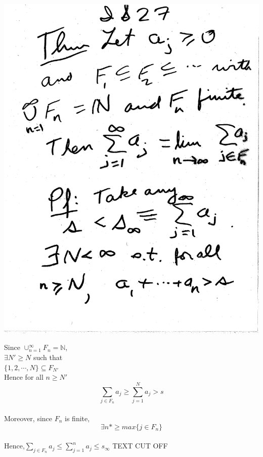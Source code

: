 \documentclass[10pt,a4paper]{article}
\begin{document}
\includegraphics[scale=.5]{Pages/IS_27}

\newpage

\noindent Since $ \cup_{n=1}^{\infty} F_n = \mathbb{N}$, 
\\ $ \exists N' \geq N$ such that
\\ $\{1,2, \cdots, N\} \subseteq F_{N'}$ 
\\ Hence for all $ n \geq N'$
$$ \sum_{j \in F_n} a_j \geq \sum_{j=1}^{N} a_j > s $$
\\ \noindent Moreover, since $F_n$ is finite, 
$$\exists n* \geq max \{ j \in F_n \}$$
\\ Hence,$\sum_{ j \in F_n } a_j \leq \sum_{j=1}^{n} a_j \leq s_\infty $ \color{blue} TEXT CUT OFF \color{black}
\end{document}
